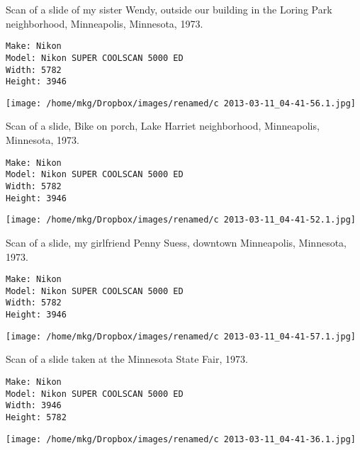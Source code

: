 \clearpage

\noindent Scan of a slide of my sister Wendy, outside our building in the Loring Park neighborhood, Minneapolis, Minnesota, 1973.

\begin{lstlisting}
Make: Nikon
Model: Nikon SUPER COOLSCAN 5000 ED
Width: 5782
Height: 3946

\end{lstlisting}

\clearpage
\texttt{[image: /home/mkg/Dropbox/images/renamed/c 2013-03-11\_04-41-56.1.jpg]}

\clearpage

\noindent Scan of a slide, Bike on porch, Lake Harriet neighborhood, Minneapolis, Minnesota, 1973.

\begin{lstlisting}
Make: Nikon
Model: Nikon SUPER COOLSCAN 5000 ED
Width: 5782
Height: 3946

\end{lstlisting}

\clearpage
\texttt{[image: /home/mkg/Dropbox/images/renamed/c 2013-03-11\_04-41-52.1.jpg]}

\clearpage

\noindent Scan of a slide, my girlfriend Penny Suess, downtown Minneapolis, Minnesota, 1973.

\begin{lstlisting}
Make: Nikon
Model: Nikon SUPER COOLSCAN 5000 ED
Width: 5782
Height: 3946

\end{lstlisting}

\clearpage
\texttt{[image: /home/mkg/Dropbox/images/renamed/c 2013-03-11\_04-41-57.1.jpg]}

\clearpage

\noindent Scan of a slide taken at the Minnesota State Fair, 1973.

\begin{lstlisting}
Make: Nikon
Model: Nikon SUPER COOLSCAN 5000 ED
Width: 3946
Height: 5782

\end{lstlisting}

\clearpage
\texttt{[image: /home/mkg/Dropbox/images/renamed/c 2013-03-11\_04-41-36.1.jpg]}

\clearpage


